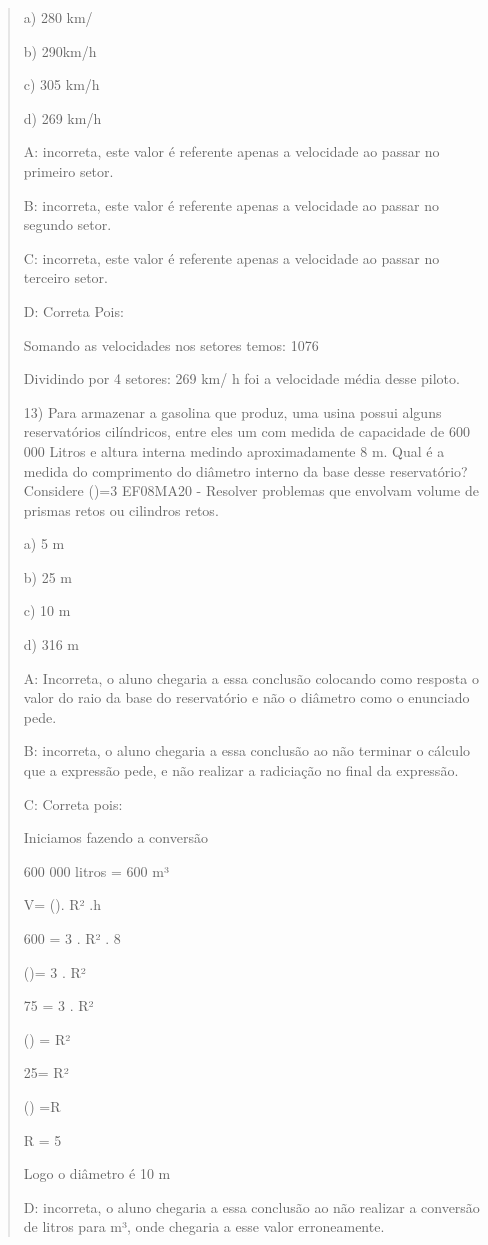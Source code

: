 \begin{quote}
\begin{escolha}
a) 280 km/

b) 290km/h

c) 305 km/h

d) 269 km/h

A: incorreta, este valor é referente apenas a velocidade ao passar no
primeiro setor.

B: incorreta, este valor é referente apenas a velocidade ao passar no
segundo setor.

C: incorreta, este valor é referente apenas a velocidade ao passar no
terceiro setor.

D: Correta Pois:

Somando as velocidades nos setores temos: 1076

Dividindo por 4 setores: 269 km/ h foi a velocidade média desse piloto.

13) Para armazenar a gasolina que produz, uma usina possui alguns
reservatórios cilíndricos, entre eles um com medida de capacidade de 600
000 Litros e altura interna medindo aproximadamente 8 m. Qual é a medida
do comprimento do diâmetro interno da base desse reservatório? Considere
(\Pi)=3 EF08MA20 - Resolver problemas que envolvam volume de prismas
retos ou cilindros retos.

a) 5 m

b) 25 m

c) 10 m

d) 316 m

A: Incorreta, o aluno chegaria a essa conclusão colocando como resposta
o valor do raio da base do reservatório e não o diâmetro como o
enunciado pede.

B: incorreta, o aluno chegaria a essa conclusão ao não terminar o
cálculo que a expressão pede, e não realizar a radiciação no final da
expressão.

C: Correta pois:

Iniciamos fazendo a conversão

600 000 litros = 600 m³

V= (\Pi). R² .h

600 = 3 . R² . 8

()= 3 . R²

75 = 3 . R²

() = R²

25= R²

() =R

R = 5

Logo o diâmetro é 10 m

D: incorreta, o aluno chegaria a essa conclusão ao não realizar a
conversão de litros para m³, onde chegaria a esse valor erroneamente.


\end{escolha}
\end{quote}
